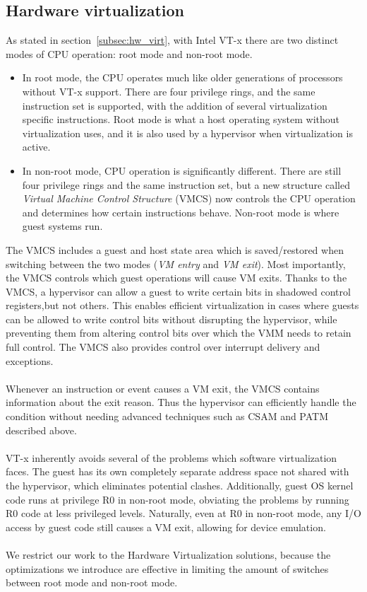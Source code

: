 \documentclass[a4paper, 12pt, titlepage]{report}
\begin{document}
\subsection{Hardware virtualization}
As stated in section~\ref{subsec:hw_virt}, with Intel VT-x there are two distinct modes of CPU operation: root mode and non-root mode.
\begin{itemize}
\item In root mode, the CPU operates much like older generations of processors without VT-x support. There are four privilege rings, and the same instruction set is supported, with the addition of several virtualization specific instructions. Root mode is what a host operating system without virtualization uses, and it is also used by a hypervisor when virtualization is active.
\item In non-root mode, CPU operation is significantly different. There are still four privilege rings and the same instruction set, but a new structure called \textit{Virtual Machine Control Structure} (VMCS) now controls the CPU operation and determines how certain instructions behave. Non-root mode is where guest systems run.
\end{itemize}
The VMCS includes a guest and host state area which is saved/restored when switching between the two modes (\textit{VM entry} and \textit{VM exit}). Most importantly, the VMCS controls which guest operations will cause VM exits.
Thanks to the VMCS, a hypervisor can allow a guest to write certain bits in shadowed control registers,but not others. This enables efficient virtualization in cases where guests can be allowed to write control bits without disrupting the hypervisor, while preventing them from altering control bits over which the VMM needs to retain full control. The VMCS also provides control over interrupt delivery and exceptions.
\\
\\
Whenever an instruction or event causes a VM exit, the VMCS contains information about the exit reason. Thus the hypervisor can efficiently handle the condition without needing advanced techniques such as CSAM and PATM described above.
\\
\\
VT-x inherently avoids several of the problems which software virtualization faces. The guest has its own completely separate address space not shared with the hypervisor, which eliminates potential clashes. Additionally, guest OS kernel code runs at privilege R0 in non-root mode, obviating the problems by running R0 code at less privileged levels. Naturally, even at R0 in non-root mode, any I/O access by guest code still causes a VM exit, allowing for device emulation.
\\
\\
We restrict our work to the Hardware Virtualization solutions, because the optimizations we introduce are effective in limiting the amount of switches between root mode and non-root mode.
\end{document}

